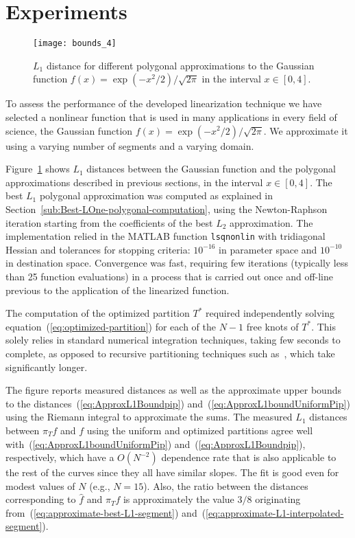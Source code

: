 \documentclass[a4paper,english]{IEEEtran}
\begin{document}
\section{Experiments\label{sec:Experiments}}

\begin{figure}
\begin{centering}
\texttt{[image: bounds\_4]}
\par\end{centering}

\caption{\label{fig:GraphicalErrors04}${L_{1}}$ distance for different polygonal
approximations to the Gaussian function $f(x)=\exp(-x^{2}/2)/\sqrt{2\pi}$
in the interval $x\in[0,4].$}
\end{figure}
To assess the performance of the developed linearization technique
we have selected a nonlinear function that is used in many applications
in every field of science, the Gaussian function $f(x)=\exp(-x^{2}/2)/\sqrt{2\pi}$.
We approximate it using a varying number of segments and a varying
domain.

Figure~\ref{fig:GraphicalErrors04} shows ${L_{1}}$ distances between
the Gaussian function and the polygonal approximations described in
previous sections, in the interval $x\in[0,4]$. The best ${L_{1}}$
polygonal approximation was computed as explained in Section~\ref{sub:Best-LOne-polygonal-computation},
using the Newton-Raphson iteration starting from the coefficients
of the best ${L_{2}}$ approximation. The implementation relied in the
MATLAB function \texttt{\small{}lsqnonlin} with tridiagonal Hessian
and tolerances for stopping criteria: $10^{-16}$ in parameter space
and $10^{-10}$ in destination space. Convergence was fast, requiring
few iterations (typically less than 25 function evaluations) in a
process that is carried out once and off-line previous to the application
of the linearized function.

The computation of the optimized partition ${{T}^{\ast}}$ required independently
solving equation~(\ref{eq:optimized-partition}) for each of the
$N-1$ free knots of ${{T}^{\ast}}$. This solely relies in standard numerical
integration techniques, taking few seconds to complete, as opposed
to recursive partitioning techniques such as~\cite{Butler2011},
which take significantly longer.

The figure reports measured distances as well as the approximate upper
bounds to the distances~(\ref{eq:ApproxL1Boundpip}) and~(\ref{eq:ApproxL1boundUniformPip})
using the Riemann integral to approximate the sums. The measured ${L_{1}}$
distances between ${\pi_{T}} f$ and $f$ using the uniform and optimized
partitions agree well with~(\ref{eq:ApproxL1boundUniformPip}) and~(\ref{eq:ApproxL1Boundpip}),
respectively, which have a $O(N^{-2})$ dependence rate that is also
applicable to the rest of the curves since they all have similar slopes.
The fit is good even for modest values of $N$ (e.g.,  $N=15$). Also,
the ratio between the distances corresponding to ${\hat{f}}$ and ${\pi_{T}} f$
is approximately the value $3/8$ originating from~(\ref{eq:approximate-best-L1-segment})
and~(\ref{eq:approximate-L1-interpolated-segment}). 
\end{document}
